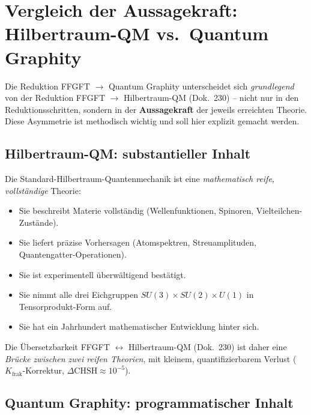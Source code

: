 \section{Vergleich der Aussagekraft: Hilbertraum-QM vs.\ Quantum Graphity}

Die Reduktion FFGFT $\to$ Quantum Graphity unterscheidet sich
\emph{grundlegend} von der Reduktion FFGFT $\to$ Hilbertraum-QM
(Dok.~230) -- nicht nur in den Reduktionsschritten, sondern in der
\textbf{Aussagekraft} der jeweils erreichten Theorie. Diese Asymmetrie
ist methodisch wichtig und soll hier explizit gemacht werden.

\subsection{Hilbertraum-QM: substantieller Inhalt}

Die Standard-Hilbertraum-Quantenmechanik ist eine \emph{mathematisch
reife, vollständige} Theorie:
\begin{itemize}[leftmargin=2em,itemsep=2pt,topsep=2pt]
  \item Sie beschreibt Materie vollständig (Wellenfunktionen,
        Spinoren, Vielteilchen-Zustände).
  \item Sie liefert präzise Vorhersagen (Atomspektren,
        Streuamplituden, Quantengatter-Operationen).
  \item Sie ist experimentell überwältigend bestätigt.
  \item Sie nimmt alle drei Eichgruppen $SU(3) \times SU(2) \times U(1)$
        in Tensorprodukt-Form auf.
  \item Sie hat ein Jahrhundert mathematischer Entwicklung hinter
        sich.
\end{itemize}

Die Übersetzbarkeit FFGFT $\leftrightarrow$ Hilbertraum-QM
(Dok.~230) ist daher eine \emph{Brücke zwischen zwei reifen
Theorien}, mit kleinem, quantifizierbarem Verlust
($K_{\text{frak}}$-Korrektur, $\Delta\text{CHSH} \approx 10^{-5}$).

\subsection{Quantum Graphity: programmatischer Inhalt}

